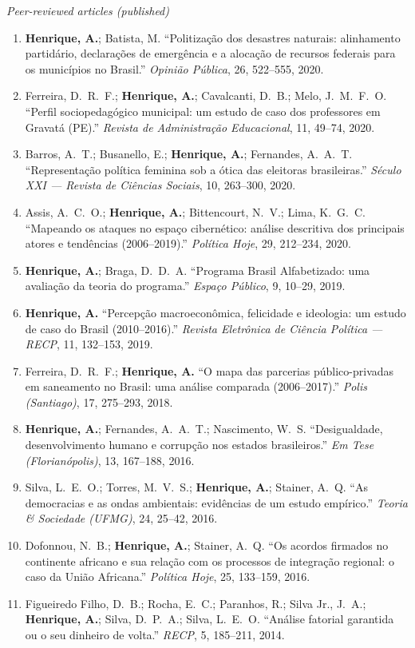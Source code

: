 \documentclass[11pt]{article}
\newcommand{\cvsubsection}[1]{\vspace{0.3em}\textit{#1}\par\vspace{0.1em}}
\begin{document}
\cvsubsection{Peer-reviewed articles (published)}
\begin{enumerate}[leftmargin=0.3in,itemsep=0.35em,parsep=0pt]
\item \textbf{Henrique, A.}; Batista, M. ``Politização dos desastres naturais: alinhamento partidário, declarações de emergência e a alocação de recursos federais para os municípios no Brasil.'' \textit{Opinião Pública}, 26, 522--555, 2020.
\item Ferreira, D.\ R.\ F.; \textbf{Henrique, A.}; Cavalcanti, D.\ B.; Melo, J.\ M.\ F.\ O. ``Perfil sociopedagógico municipal: um estudo de caso dos professores em Gravatá (PE).'' \textit{Revista de Administração Educacional}, 11, 49--74, 2020.
\item Barros, A.\ T.; Busanello, E.; \textbf{Henrique, A.}; Fernandes, A.\ A.\ T. ``Representação política feminina sob a ótica das eleitoras brasileiras.'' \textit{Século XXI --- Revista de Ciências Sociais}, 10, 263--300, 2020.
\item Assis, A.\ C.\ O.; \textbf{Henrique, A.}; Bittencourt, N.\ V.; Lima, K.\ G.\ C. ``Mapeando os ataques no espaço cibernético: análise descritiva dos principais atores e tendências (2006--2019).'' \textit{Política Hoje}, 29, 212--234, 2020.
\item \textbf{Henrique, A.}; Braga, D.\ D.\ A. ``Programa Brasil Alfabetizado: uma avaliação da teoria do programa.'' \textit{Espaço Público}, 9, 10--29, 2019.
\item \textbf{Henrique, A.} ``Percepção macroeconômica, felicidade e ideologia: um estudo de caso do Brasil (2010--2016).'' \textit{Revista Eletrônica de Ciência Política --- RECP}, 11, 132--153, 2019.
\item Ferreira, D.\ R.\ F.; \textbf{Henrique, A.} ``O mapa das parcerias público-privadas em saneamento no Brasil: uma análise comparada (2006--2017).'' \textit{Polis (Santiago)}, 17, 275--293, 2018.
\item \textbf{Henrique, A.}; Fernandes, A.\ A.\ T.; Nascimento, W.\ S. ``Desigualdade, desenvolvimento humano e corrupção nos estados brasileiros.'' \textit{Em Tese (Florianópolis)}, 13, 167--188, 2016.
\item Silva, L.\ E.\ O.; Torres, M.\ V.\ S.; \textbf{Henrique, A.}; Stainer, A.\ Q. ``As democracias e as ondas ambientais: evidências de um estudo empírico.'' \textit{Teoria \& Sociedade (UFMG)}, 24, 25--42, 2016.
\item Dofonnou, N.\ B.; \textbf{Henrique, A.}; Stainer, A.\ Q. ``Os acordos firmados no continente africano e sua relação com os processos de integração regional: o caso da União Africana.'' \textit{Política Hoje}, 25, 133--159, 2016.
\item Figueiredo Filho, D.\ B.; Rocha, E.\ C.; Paranhos, R.; Silva Jr., J.\ A.; \textbf{Henrique, A.}; Silva, D.\ P.\ A.; Silva, L.\ E.\ O. ``Análise fatorial garantida ou o seu dinheiro de volta.'' \textit{RECP}, 5, 185--211, 2014.
\end{enumerate}
\end{document}
